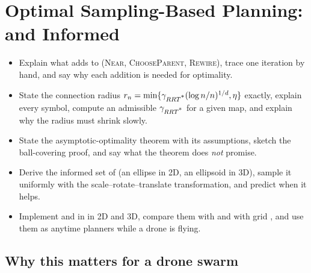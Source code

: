 \chapter[\rrtstar and \irrtstar]{Optimal Sampling-Based Planning: \rrtstar and Informed \rrtstar}
\label{ch:ch17}

\begin{objectives}
\begin{itemize}
  \item Explain what \rrtstar adds to \rrt (\textsc{Near}, \textsc{ChooseParent}, \textsc{Rewire}), trace one iteration by hand, and say why each addition is needed for optimality.
  \item State the connection radius $r_n=\min\{\gamma_{RRT\textsuperscript{*}}(\log n/n)^{1/d},\eta\}$ exactly, explain every symbol, compute an admissible $\gamma_{RRT\textsuperscript{*}}$ for a given map, and explain why the radius must shrink slowly.
  \item State the asymptotic-optimality theorem with its assumptions, sketch the ball-covering proof, and say what the theorem does \emph{not} promise.
  \item Derive the informed set of \irrtstar (an ellipse in 2D, an ellipsoid in 3D), sample it uniformly with the scale--rotate--translate transformation, and predict when it helps.
  \item Implement \rrtstar and \irrtstar in \python in 2D and 3D, compare them with \rrt and with grid \astar, and use them as anytime planners while a drone is flying.
\end{itemize}
\end{objectives}

\section{Why this matters for a drone swarm}
\label{sec:ch17-motivation}

